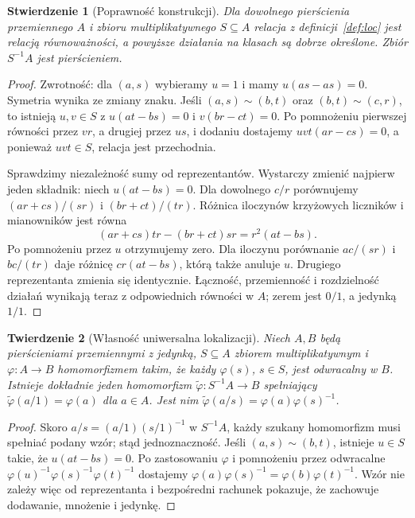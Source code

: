 \documentclass[11pt,a4paper,openany]{report}
\numberwithin{equation}{section}
\theoremstyle{plain}
\newtheorem{twierdzenie}{Twierdzenie}[section]
\newtheorem{stwierdzenie}[twierdzenie]{Stwierdzenie}
\theoremstyle{definition}
\theoremstyle{remark}
\begin{document}
\begin{stwierdzenie}[Poprawność konstrukcji]
\label{st:loc-popr}
Dla dowolnego pierścienia przemiennego $A$ i zbioru
multiplikatywnego $S\subseteq A$ relacja z definicji~\ref{def:loc}
jest relacją równoważności, a powyższe działania na klasach
są dobrze określone. Zbiór $S^{-1}A$ jest pierścieniem.
\end{stwierdzenie}
\begin{proof}
Zwrotność: dla $(a,s)$ wybieramy $u=1$ i mamy
$u(as-as)=0$. Symetria wynika ze zmiany znaku.
Jeśli $(a,s)\sim(b,t)$ oraz $(b,t)\sim(c,r)$,
to istnieją $u,v\in S$ z $u(at-bs)=0$ i $v(br-ct)=0$.
Po pomnożeniu pierwszej równości przez $vr$,
a drugiej przez $us$, i dodaniu dostajemy
$uvt(ar-cs)=0$, a ponieważ $uvt\in S$, relacja jest
przechodnia.

Sprawdzimy niezależność sumy od reprezentantów. Wystarczy
zmienić najpierw jeden składnik: niech $u(at-bs)=0$.
Dla dowolnego $c/r$ porównujemy
$(ar+cs)/(sr)$ i $(br+ct)/(tr)$.
Różnica iloczynów krzyżowych liczników i mianowników
jest równa
\[
 (ar+cs)tr-(br+ct)sr=r^2(at-bs).
\]
Po pomnożeniu przez $u$ otrzymujemy zero. Dla iloczynu
porównanie $ac/(sr)$ i $bc/(tr)$ daje różnicę
$cr(at-bs)$, którą także anuluje $u$. Drugiego
reprezentanta zmienia się identycznie.
Łączność, przemienność i rozdzielność działań
wynikają teraz z odpowiednich równości w $A$;
zerem jest $0/1$, a jedynką $1/1$.
\end{proof}

\begin{twierdzenie}[Własność uniwersalna lokalizacji]
\label{tw:loc-up}
Niech $A,B$ będą pierścieniami przemiennymi z jedynką,
$S\subseteq A$ zbiorem multiplikatywnym i
$\varphi:A\to B$ homomorfizmem takim, że każdy
$\varphi(s)$, $s\in S$, jest odwracalny w $B$.
Istnieje dokładnie jeden homomorfizm
$\widetilde\varphi:S^{-1}A\to B$ spełniający
$\widetilde\varphi(a/1)=\varphi(a)$ dla $a\in A$.
Jest nim $\widetilde\varphi(a/s)=\varphi(a)\varphi(s)^{-1}$.
\end{twierdzenie}
\begin{proof}
Skoro $a/s=(a/1)(s/1)^{-1}$ w $S^{-1}A$,
każdy szukany homomorfizm musi spełniać podany wzór;
stąd jednoznaczność. Jeśli $(a,s)\sim(b,t)$,
istnieje $u\in S$ takie, że $u(at-bs)=0$. Po
zastosowaniu $\varphi$ i pomnożeniu przez odwracalne
$\varphi(u)^{-1}\varphi(s)^{-1}\varphi(t)^{-1}$
dostajemy $\varphi(a)\varphi(s)^{-1}
=\varphi(b)\varphi(t)^{-1}$.
Wzór nie zależy więc od reprezentanta i bezpośredni
rachunek pokazuje, że zachowuje dodawanie, mnożenie
i jedynkę.
\end{proof}
\end{document}
